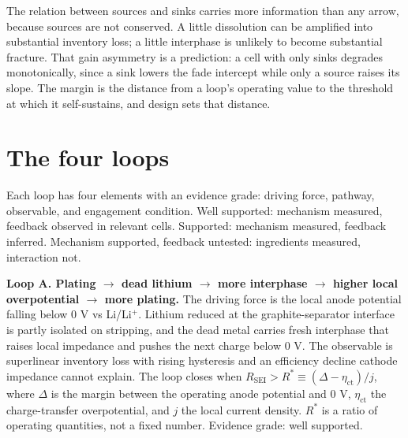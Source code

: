 \documentclass[AMA,Times2COL]{WileyNJDv5}
\begin{document}
The relation between sources and sinks carries more information than any arrow, because sources are not conserved. A little dissolution can be amplified into substantial inventory loss; a little interphase is unlikely to become substantial fracture. That gain asymmetry is a prediction: a cell with only sinks degrades monotonically, since a sink lowers the fade intercept while only a source raises its slope. The margin is the distance from a loop's operating value to the threshold at which it self-sustains, and design sets that distance.

\section{The four loops}\label{sec:Thefourloops}
Each loop has four elements with an evidence grade: driving force, pathway, observable, and engagement condition. Well supported: mechanism measured, feedback observed in relevant cells. Supported: mechanism measured, feedback inferred. Mechanism supported, feedback untested: ingredients measured, interaction not.

\textbf{Loop A. Plating $\rightarrow$ dead lithium $\rightarrow$ more interphase $\rightarrow$ higher local overpotential $\rightarrow$ more plating.} The driving force is the local anode potential falling below 0 V vs Li/Li$^{+}$. Lithium reduced at the graphite-separator interface is partly isolated on stripping, and the dead metal carries fresh interphase that raises local impedance and pushes the next charge below 0 V.\cite{hsieh2020quantification,vil2020nickel,betz2019cross} The observable is superlinear inventory loss with rising hysteresis and an efficiency decline cathode impedance cannot explain. The loop closes when $R_{\mathrm{SEI}} > R^{\ast} \equiv (\Delta-\eta_{\mathrm{ct}})/j$, where $\Delta$ is the margin between the operating anode potential and 0 V, $\eta_{\mathrm{ct}}$ the charge-transfer overpotential, and $j$ the local current density. $R^{\ast}$ is a ratio of operating quantities, not a fixed number. Evidence grade: well supported.
\end{document}
